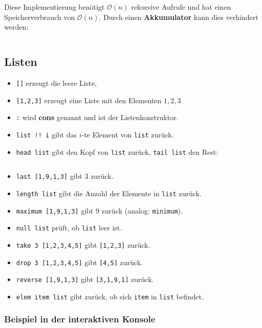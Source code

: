 Diese Implementierung benötigt $\mathcal{O}(n)$ rekursive Aufrufe und
hat einen Speicherverbrauch von $\mathcal{O}(n)$. Durch einen
\textbf{Akkumulator} kann dies verhindert werden:
\inputminted[numbersep=5pt, tabsize=4]{haskell}{scripts/haskell/fakultaet-akkumulator.hs}

\subsection{Listen}
\begin{itemize}
    \item \texttt{[]} erzeugt die leere Liste,
    \item \texttt{[1,2,3]} erzeugt eine Liste mit den Elementen $1, 2, 3$
    \item \texttt{:} wird \textbf{cons} genannt und ist
          der Listenkonstruktor.
    \item \texttt{list !! i} gibt das $i$-te Element von \texttt{list} zurück.
    \item \texttt{head list} gibt den Kopf von \texttt{list} zurück,
          \texttt{tail list} den Rest:
          \inputminted[numbersep=5pt, tabsize=4]{haskell}{scripts/haskell/list-basic.sh}
    \item \texttt{last [1,9,1,3]} gibt 3 zurück.
    \item \texttt{length list} gibt die Anzahl der Elemente in \texttt{list} zurück.
    \item \texttt{maximum [1,9,1,3]} gibt 9 zurück (analog: \texttt{minimum}).
    \item \texttt{null list} prüft, ob \texttt{list} leer ist.
    \item \texttt{take 3 [1,2,3,4,5]} gibt \texttt{[1,2,3]} zurück.
    \item \texttt{drop 3 [1,2,3,4,5]} gibt \texttt{[4,5]} zurück.
    \item \texttt{reverse [1,9,1,3]} gibt \texttt{[3,1,9,1]} zurück.
    \item \texttt{elem item list} gibt zurück, ob sich \texttt{item} in \texttt{list} befindet.
\end{itemize}

\subsubsection{Beispiel in der interaktiven Konsole}
\inputminted[numbersep=5pt, tabsize=4]{haskell}{scripts/haskell/listenoperationen.sh}

